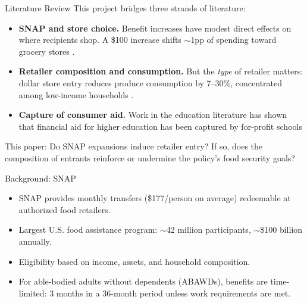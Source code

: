 \documentclass[10pt,aspectratio=169]{beamer}
\begin{document}
\begin{frame}{Literature Review}
This project bridges three strands of literature:
\begin{itemize}
    \item \alert{\textbf{SNAP and store choice.}} Benefit increases have modest direct effects on where recipients shop. A \$100 increase shifts $\sim$1pp of spending toward grocery stores \citep{cuffey2022effects}.
    \item \alert{\textbf{Retailer composition and consumption.}} But the \emph{type} of retailer matters: dollar store entry reduces produce consumption by 7--30\%, concentrated among low-income households \citep{caoui2025dollar}.
    \item \alert{\textbf{Capture of consumer aid.}} Work in the education literature has shown that financial aid for higher education has been captured by for-profit schools \citep{Cellini2010FinancialAidForProfit,CelliniGoldin2014FederalAidTuition}
\end{itemize}
\alert{This paper:} Do SNAP expansions induce retailer entry? If so, does the composition of entrants reinforce or undermine the policy's food security goals?
\end{frame}

\begin{frame}{Background: SNAP}
\begin{itemize}
    \item SNAP provides monthly transfers (\$177/person on average) redeemable at authorized food retailers.
    \item Largest U.S. food assistance program: $\sim$42 million participants, $\sim$\$100 billion annually.
    \item Eligibility based on income, assets, and household composition.
    \item For able-bodied adults without dependents (ABAWDs), benefits are time-limited: 3 months in a 36-month period unless work requirements are met.
\end{itemize}
\end{frame}
\end{document}
